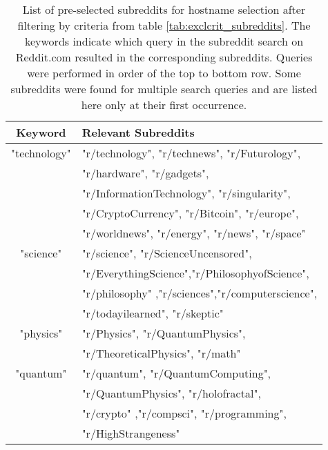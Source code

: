 

\begin{table}[ht]
\centering
\begin{tabular}{c@{\hspace{20pt}}p{10cm}}
\toprule
\textbf{Keyword} & \textbf{Relevant Subreddits} \\
\midrule
 "technology" & "r/technology", "r/technews", "r/Futurology", \\ & "r/hardware", "r/gadgets",  \\  & "r/InformationTechnology",  "r/singularity", \\  &"r/CryptoCurrency", "r/Bitcoin",  "r/europe", \\  & "r/worldnews", "r/energy", "r/news", "r/space" \\
\midrule
 "science" & "r/science", "r/ScienceUncensored", \\  & "r/EverythingScience","r/PhilosophyofScience", \\  & "r/philosophy" ,"r/sciences","r/computerscience", \\  & "r/todayilearned", "r/skeptic" \\
 \midrule
 "physics" & "r/Physics", "r/QuantumPhysics", \\  & "r/TheoreticalPhysics", "r/math" \\
 \midrule
 "quantum" & "r/quantum", "r/QuantumComputing", \\  & "r/QuantumPhysics", "r/holofractal", \\  & "r/crypto" ,"r/compsci", "r/programming", \\  & "r/HighStrangeness" \\
\bottomrule 
\end{tabular}
\vspace{5pt}
\caption{List of pre-selected subreddits for hostname selection after filtering by criteria from table \ref{tab:exclcrit_subreddits}. The keywords indicate which query in the subreddit search on Reddit.com resulted in the corresponding subreddits. Queries were performed in order of the top to bottom row. Some subreddits were found for multiple search queries and are listed here only at their first occurrence.}
\label{tab:selectedsubreddits}
\end{table}

